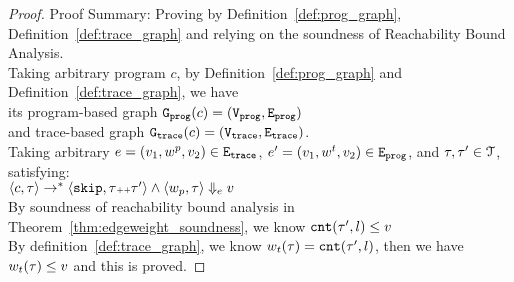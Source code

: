 \begin{proof}
Proof Summary: Proving by Definition~\ref{def:prog_graph}, Definition~\ref{def:trace_graph} and relying on the soundness of Reachability Bound 
Analysis.
\\
Taking arbitrary program $c$,
by Definition~\ref{def:prog_graph} and Definition~\ref{def:trace_graph}, 
we have   
\\
its program-based graph $\mathtt{{G_{prog}}}({c}) = (\mathtt{{V_{prog}}}, \mathtt{{E_{prog}}})$ 
\\
and 
trace-based graph $\mathtt{{G_{trace}}}({c}) = (\mathtt{{V_{trace}}}, \mathtt{{E_{trace}}})$.
\\
Taking arbitrary 
$e = (v_1, w^p, v_2) \in \mathtt{{E_{trace}}}$,
$e' = (v_1, w^t, v_2) \in \mathtt{{E_{prog}}}$, and $\mathtt{\tau}, \mathtt{\tau}' \in \mathcal{T}$, satisfying:
\\
$\langle {c}, \mathtt{\tau} \rangle \to^{*} \langle \mathtt{skip}, \mathtt{\tau}{\scriptscriptstyle ++}\mathtt{\tau}' \rangle 
\land 
\langle w_{p}, \mathtt{\tau} \rangle \Downarrow_e v$
\\
By soundness of reachability bound analysis in Theorem~\ref{thm:edgeweight_soundness}, we know 
$\mathtt{cnt}(\mathtt{\tau}', l) \leq v$
\\
By definition~\ref{def:trace_graph}, we know $w_t(\mathtt{\tau}) = \mathtt{cnt}(\mathtt{\tau}', l)$,
then we have $w_t(\mathtt{\tau}) \leq v$ and this is proved.
\end{proof}
